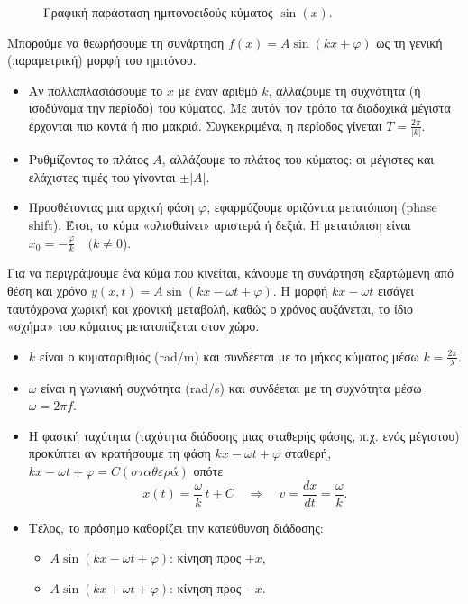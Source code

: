 \documentclass[a4paper, 11pt]{article}
\begin{document}
\begin{figure}[htbp]
\centering
{}
\caption{Γραφική παράσταση ημιτονοειδούς κύματος $\sin(x)$.}
\label{fig:sinx}
\end{figure}

Μπορούμε να θεωρήσουμε τη συνάρτηση \(f(x)=A\sin(kx+\varphi)\) ως τη
γενική (παραμετρική) μορφή του ημιτόνου.

\begin{itemize}
\item
  Αν πολλαπλασιάσουμε το \(x\) με έναν αριθμό \(k\), αλλάζουμε τη
  συχνότητα (ή ισοδύναμα την περίοδο) του κύματος. Με αυτόν τον τρόπο τα
  διαδοχικά μέγιστα έρχονται πιο κοντά ή πιο μακριά. Συγκεκριμένα, η
  περίοδος γίνεται \(T=\frac{2\pi}{|k|}\).
\item
  Ρυθμίζοντας το πλάτος \(A\), αλλάζουμε το πλάτος του κύματος: οι
  μέγιστες και ελάχιστες τιμές του γίνονται \(\pm|A|\).
\item
  Προσθέτοντας μια αρχική φάση \(\varphi\), εφαρμόζουμε οριζόντια
  μετατόπιση (phase shift). Έτσι, το κύμα «ολισθαίνει» αριστερά ή δεξιά.
  Η μετατόπιση είναι \(x_0=-\frac{\varphi}{k}\quad (k\neq 0\)).
\end{itemize}

Για να περιγράψουμε ένα κύμα που κινείται, κάνουμε τη συνάρτηση
εξαρτώμενη από θέση και χρόνο \(y(x,t)=A\sin(kx-\omega t + \varphi)\). Η
μορφή \(kx-\omega t\) εισάγει ταυτόχρονα χωρική και χρονική μεταβολή,
καθώς ο χρόνος αυξάνεται, το ίδιο «σχήμα» του κύματος μετατοπίζεται στον
χώρο.

\begin{itemize}
\item
  \(k\) είναι ο κυματαριθμός (rad/m) και συνδέεται με το μήκος κύματος
  μέσω \(k=\frac{2\pi}{\lambda}\).
\item
  \(\omega\) είναι η γωνιακή συχνότητα (rad/s) και συνδέεται με τη
  συχνότητα μέσω \(\omega=2\pi f\).
\item
  Η φασική ταχύτητα (ταχύτητα διάδοσης μιας σταθερής φάσης, π.χ. ενός
  μέγιστου) προκύπτει αν κρατήσουμε τη φάση \(kx-\omega t+\varphi\)
  σταθερή, \(kx-\omega t+\varphi = C (σταθερά)\) οπότε \[
  x(t)=\frac{\omega}{k}\,t+C
  \quad\Rightarrow\quad
  v=\frac{dx}{dt}=\frac{\omega}{k}.
  \]
\item
  Τέλος, το πρόσημο καθορίζει την κατεύθυνση διάδοσης:

  \begin{itemize}
  \item
    \(A\sin(kx-\omega t+\varphi)\): κίνηση προς \(+x\),
  \item
    \(A\sin(kx+\omega t+\varphi)\): κίνηση προς \(-x\).
  \end{itemize}
\end{itemize}
\end{document}
